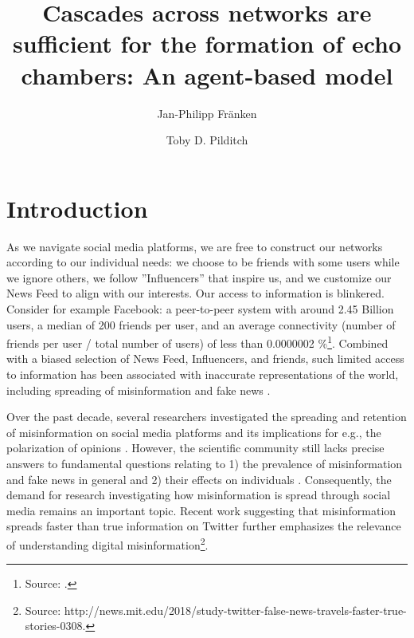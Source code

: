 \documentclass[doc,floatsintext]{apa6}
\title{\textbf{Cascades across networks are sufficient for the formation of echo chambers: An agent-based model}}
\author[1]{Jan-Philipp Fr{\"a}nken}
\author[2 3]{Toby D. Pilditch}
\affil[1]{Department of Psychology, University of Edinburgh}
\affil[2]{School of Geography and the Environment, University of Oxford}
\affil[3]{Department of Experimental Psychology, University College London}
\affiliation{\mbox{}}
\begin{document}
\setlength{\parindent}{2em}
\maketitle

\section{Introduction}

As we navigate social media platforms, we are free to construct our networks according to our individual needs: we choose to be friends with some users while we ignore others, we follow ''Influencers'' that inspire us, and we customize our News Feed to align with our interests. Our access to information is blinkered. Consider for example Facebook: a peer-to-peer system with around 2.45 Billion users, a median of 200 friends per user, and an average connectivity (number of friends per user / total number of users) of less than 0.0000002 \%\footnote{Source: \href{https://www.brandwatch.com/blog/facebook-statistics/}{}.}. Combined with a biased selection of News Feed, Influencers, and friends, such limited access to information has been associated with inaccurate representations of the world, including spreading of misinformation \citep{del2016spreading} and fake news \citep{vosoughi2018spread}. 

Over the past decade, several researchers investigated the spreading and retention of misinformation on social media platforms \citep{starbird2014rumors, bessi2015science, del2016spreading} and its implications for e.g., the polarization of opinions \citep{bessi2016users}. However, the scientific community still lacks precise answers to fundamental questions relating to 1) the prevalence of misinformation and fake news in general and 2) their effects on individuals \citep{lazer2018science}. Consequently, the demand for research investigating how misinformation is spread through social media remains an important topic. Recent work suggesting that misinformation spreads faster than true information on Twitter further emphasizes the relevance of understanding digital misinformation\footnote{Source: http://news.mit.edu/2018/study-twitter-false-news-travels-faster-true-stories-0308.}.
\end{document}
